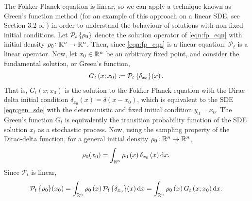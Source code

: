 The Fokker-Planck equation is linear, so we can apply a technique known as Green's function method (for an example of this approach on a linear SDE, see Section 3.2 of \citet{Risken_2012_FokkerPlanckEquationMethods}) in order to understand the behaviour of solutions with non-fixed initial conditions.
Let \(\mathcal{P}_t\set{\rho_0}\) denote the solution operator of \eqref{eqn:fp_eqn} with initial density \(\rho_0\colon \mathbb{R}^n \to \mathbb{R}^n\).
Then, since \eqref{eqn:fp_eqn} is a linear equation, \(\mathcal{P}_t\) is a linear operator.
Now, let \(x_0 \in \mathbb{R}^n\) be an arbitrary fixed point, and consider the fundamental solution, or Green's function,
\[
	G_t\left(x; x_0\right) \coloneqq \mathcal{P}_t\set{\delta_{x_0}}\!\left(x\right).
\]
That is, \(G_t\left(x; x_0\right)\) is the solution to the Fokker-Planck equation with the Dirac-delta initial condition \(\delta_{x_0}(x) = \delta\left(x - x_0\right)\), which is equivalent to the SDE \eqref{eqn:gen_sde} with the deterministic and fixed initial condition \(y_0 = x_0\).
The Green's function \(G_t\) is equivalently the transition probability function of the SDE solution \(x_t\) as a stochastic process.
Now, using the sampling property of the Dirac-delta function, for a general initial density \(\rho_0\colon \mathbb{R}^n \to \mathbb{R}^n\),
\[
	\rho_0(x_0) = \int_{\R^n}{\rho_0\left(x\right)\delta_{x_0}\left(x\right)\dif x}.
\]
Since \(\mathcal{P}_t\) is linear,
\begin{equation}
	\mathcal{P}_t\set{\rho_0}\!\left(x_0\right) = \int_{\R^n}{\rho_0\left(x\right)\mathcal{P}_t\set{\delta_{x_0}}\!\left(x\right)\dif x} = \int_{\R^n}{\rho_0\left(x\right) G_t\left(x; x_0\right)\dif x}.
	\label{eqn:fp_greens_trick}
\end{equation}








